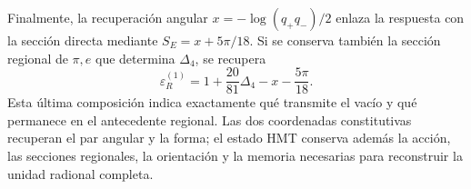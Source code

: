 Finalmente, la recuperación angular
$x=-\log(q_+q_-)/2$ enlaza la respuesta con la sección directa mediante
$S_E=x+5\pi/18$. Si se conserva también la sección regional de
$\pi,e$ que determina $\Delta_4$, se recupera
\[
 \varepsilon_R^{(1)}
 =1+\frac{20}{81}\Delta_4-x-\frac{5\pi}{18}.
\]
Esta última composición indica exactamente qué transmite el vacío y qué
permanece en el antecedente regional. Las dos coordenadas constitutivas
recuperan el par angular y la forma; el estado HMT conserva además la
acción, las secciones regionales, la orientación y la memoria necesarias
para reconstruir la unidad radional completa.
